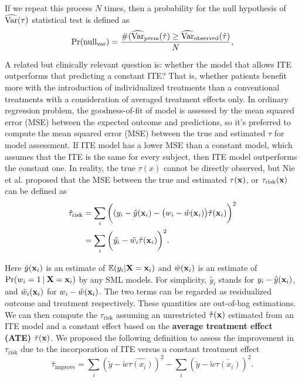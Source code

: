     If we repeat this process $N$ times, then a probability for the null hypothesis of $\operatorname{\widehat{Var}}(\tau)$ statistical test is defined as 
    \begin{equation}
      \Pr (\mathrm{null_{var}}) = \frac{\#(\operatorname{\widehat{Var}}_\mathrm{perm}(\hat{\tau})\geq \operatorname{\widehat{Var}}_\mathrm{observed}(\hat{\tau})}{N},
    \end{equation}
    
    A related but clinically relevant question is: whether the model that allows ITE outperforms that predicting a constant ITE? That is, whether patients benefit more with the introduction of individualized treatments than a conventional treatments with a consideration of averaged treatment effects only. In ordinary regression problem, the goodness-of-fit of model is assessed by the mean squared error (MSE) between the expected outcome and predictions, so it's preferred to compute the mean squared error (MSE) between the true and estimated $\tau$ for model assessment. If  ITE model has a lower MSE than a constant model, which assumes that the ITE is the same for every subject, then ITE model outperforms the constant one. In reality, the true $\tau(x)$ cannot be directly observed, but Nie et al. \cite{nie2017quasi} proposed that the MSE between the true and estimated $\tau(\mathbf{x})$, or $\tau_\mathrm{risk}(\mathrm{\mathbf{x}})$ can be defined as 
    \begin{equation}
      \begin{split}
        \hat{\tau}_\mathrm{risk} & = \sum_{i} \bigg ( (y_i - \hat{y}(\mathbf{x}_i) - \big (w_i - \hat{w}(\mathbf{x}_i) \big) \hat{\tau}(\mathbf{x}_i) \bigg ) ^2 \\
        & = \sum_{i} \bigg( \tilde{y_i} - \tilde{w_i} \hat{\tau}(\mathbf{x}_i) \bigg )^2.
      \end{split}
    \end{equation}

    Here $\hat{y}(\mathbf{x}_i)$ is an estimate of $\mathbb{E}(y_i|\mathbf{X}=\mathbf{x}_i)$ and $\hat{w}(\mathbf{x}_i)$ is an estimate of $\Pr(w_i=1 \:\vert\: \mathbf{X}=\mathbf{x}_i)$ by any SML models. For simplicity, $\tilde{y_i}$ stands for $y_i - \hat{y}(\mathbf{x}_i)$, and $\tilde{w}_i (\mathbf{x}_i)$ for $w_i - \hat{w}(\mathbf{x}_i)$. The two terms can be regarded as residualized outcome and treatment respectively. These quantities are out-of-bag estimations. We can then compute the $\tau_\mathrm{risk}$ assuming an unrestricted $\hat{\tau}(\mathbf{x})$ estimated from an ITE model and a constant effect based on the \textbf{average treatment effect (ATE)} $\bar{\tau}(\mathbf{x})$. We proposed the following definition to assess the improvement in $\tau_\mathrm{risk}$ due to the incorporation of ITE versus a constant treatment effect
    \begin{equation}
      \hat{\tau}_\mathrm{improve} = \sum_{i}(\tilde{y} - \tilde{w} \hat{\tau(x_i)})^2 - \sum_{i}(\tilde{y} - \tilde{w} \bar{\tau(x_i)})^2.
    \end{equation}

